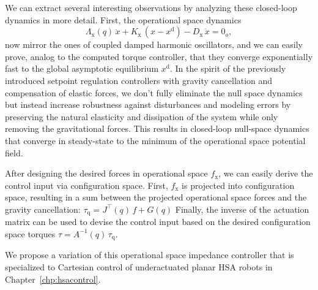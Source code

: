 We can extract several interesting observations by analyzing these closed-loop dynamics in more detail. First, the operational space dynamics
\begin{equation}
    \Lambda_\mathrm{x}(q) \, \ddot{x} + K_\mathrm{x} \, (x - x^\mathrm{d}) - D_\mathrm{x} \, \dot{x} = 0_{o},
\end{equation}
now mirror the ones of coupled damped harmonic oscillators, and we can easily prove, analog to the computed torque controller, that they converge exponentially fast to the global asymptotic equilibrium $x^\mathrm{d}$.
In the spirit of the previously introduced setpoint regulation controllers with gravity cancellation and compensation of elastic forces, we don't fully eliminate the null space dynamics but instead increase robustness against disturbances and modeling errors by preserving the natural elasticity and dissipation of the system while only removing the gravitational forces. This results in closed-loop null-space dynamics that converge in steady-state to the minimum of the operational space potential field.

After designing the desired forces in operational space $f_\mathrm{x}$, we can easily derive the control input via configuration space. First, $f_\mathrm{x}$ is projected into configuration space, resulting in a sum between the projected operational space forces and the gravity cancellation: $\tau_\mathrm{q} = J^\top(q) \, f + G(q)$ 
Finally, the inverse of the actuation matrix can be used to devise the control input based on the desired configuration space torques $\tau = A^{-1}(q) \, \tau_\mathrm{q}$.

We propose a variation of this operational space impedance controller that is specialized to Cartesian control of underactuated planar \gls{HSA} robots in Chapter~\ref{chp:hsacontrol}.
